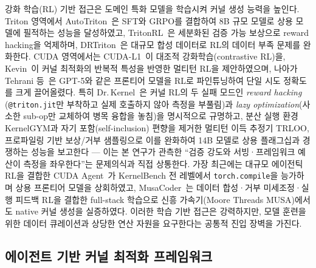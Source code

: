 \documentclass[sigplan,screen,review,anonymous]{acmart}
\begin{document}
강화 학습(RL) 기반 접근은 도메인 특화 모델을 학습시켜 커널 생성 능력을 높인다.
Triton 영역에서 AutoTriton~\cite{li2025autotriton}은 SFT와 GRPO를 결합하여
8B 규모 모델로 상용 모델에 필적하는 성능을 달성하였고,
TritonRL~\cite{woo2025tritonrl}은 세분화된 검증 가능 보상으로 reward hacking을 억제하며,
DRTriton~\cite{drtriton2025}은 대규모 합성 데이터로 RL의 데이터 부족 문제를 완화한다.
CUDA 영역에서는 CUDA-L1~\cite{cudal1_2026}이 대조적 강화학습(contrastive RL)을,
Kevin~\cite{baronio2025kevin}이 커널 최적화의 반복적 특성을 반영한 멀티턴 RL을 제안하였으며,
나아가 Tehrani 등~\cite{tehrani2026gpt5kernel}은 GPT-5와 같은 프론티어 모델을
RL로 파인튜닝하여 단일 시도 정확도를 크게 끌어올렸다.
특히 Dr.\,Kernel~\cite{drkernel2026}은 커널 RL의 두 실패 모드인 \emph{reward hacking}
(\texttt{@triton.jit}만 부착하고 실제 호출하지 않아 측정을 부풀림)과
\emph{lazy optimization}(사소한 sub-op만 교체하여 병목 융합을 놓침)을 명시적으로 규명하고,
분산 실행 환경 KernelGYM과 자기 포함(self-inclusion) 편향을 제거한 멀티턴 이득 추정기 TRLOO,
프로파일링 기반 보상/거부 샘플링으로 이를 완화하여 14B 모델로 상용 플래그십과 경쟁하는 성능을 보고한다 ---
이는 본 연구가 관측한 ``검증 강도와 서빙·프레임워크 예산이 측정을 좌우한다''는 문제의식과 직접 상통한다.
가장 최근에는 대규모 에이전틱 RL을 결합한 CUDA Agent~\cite{dai2026cudaagent}가
KernelBench 전 레벨에서 \texttt{torch.compile}을 능가하며 상용 프론티어 모델을 상회하였고,
MusaCoder~\cite{cheng2026musacoder}는 데이터 합성·거부 미세조정·실행 피드백 RL을 결합한
full-stack 학습으로 신흥 가속기(Moore Threads MUSA)에서도 native 커널 생성을 실증하였다.
이러한 학습 기반 접근은 강력하지만, 모델 훈련을 위한 데이터 큐레이션과
상당한 연산 자원을 요구한다는 공통적 진입 장벽을 가진다.

\subsection{에이전트 기반 커널 최적화 프레임워크}
\end{document}
